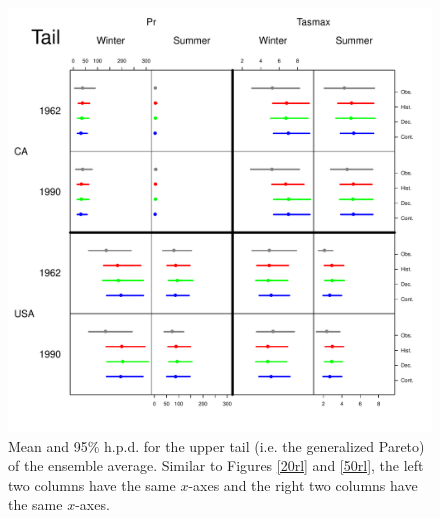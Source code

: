 \documentclass[12pt]{article}
\begin{document}
\begin{figure}
\begin{center}
\includegraphics[scale=0.72]{figs/tail.pdf}
\end{center}
\caption{Mean and 95\% h.p.d. for the upper tail (i.e. the generalized Pareto) of the ensemble average. Similar to Figures \ref{20rl} and \ref{50rl}, the left two columns have the same $x$-axes and the right two columns have the same $x$-axes.}
\label{tail}
\end{figure}
\end{document}
